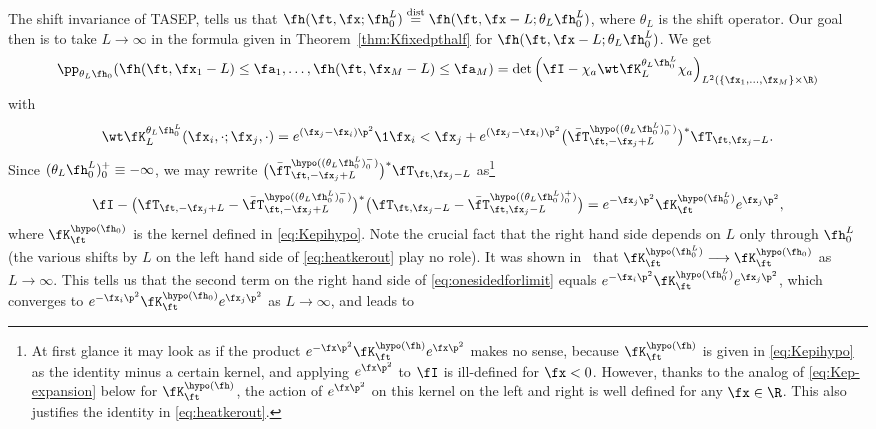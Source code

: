 \documentclass[]{pcmi}
\theoremstyle{plain}
\theoremstyle{definition}
\begin{document}
The shift invariance of TASEP, tells us that $\fh(\ft, \fx; \fh_0^L)\stackrel{\text{dist}}{=} \fh(\ft,\fx-L;\theta_L\fh_0^L)$, where $\theta_L$ is the shift operator.
Our goal then is to take $L\to\infty$ in the formula given in Theorem~\ref{thm:Kfixedpthalf} for $\fh(\ft,\fx-L;\theta_L\fh_0^L)$.
We get
\[\pp_{\theta_L\fh_0}\!\left(\fh(\ft,\fx_1-L)\leq \fa_1,\ldots,\fh(\ft,\fx_M-L)\leq \fa_M\right)
=\det\left(\fI-\chi_{a}\wt\fK^{\theta_L\fh_0^L}_L\chi_{a}\right)_{L^2(\{\fx_1,\ldots,\fx_M\}\times\R)}\]
with
\begin{equation}\label{eq:onesidedforlimit}
\wt\fK^{\theta_L\fh_0^L}_L(\fx_i,\cdot ;\fx_j,\cdot)=e^{(\fx_j-\fx_i)\p^2}\1{\fx_i<\fx_j}+e^{(\fx_j-\fx_i)\p^2}\bigl(\bar{\fT}^{\hypo((\theta_L\fh_0^L)^-_0)}_{\ft,-\fx_j+L}\bigr)^*\fT_{\ft,\fx_j-L}.
\end{equation}
Since $(\theta_{L}\fh_0^L)_0^+\equiv-\infty$, we may rewrite $\bigl(\bar{\fT}^{\hypo((\theta_L\fh_0^L)^-_0)}_{\ft,-\fx_j+L}\bigr)^*\fT_{\ft,\fx_j-L}$ as\footnote{At first glance it may look as if the product $e^{-\fx\p^2}\fK^{\hypo(\fh)}_\ft e^{\fx\p^2}$ makes no sense, because $\fK^{\hypo(\fh)}_{\ft}$ is given in \eqref{eq:Kepihypo} as the identity minus a certain kernel, and applying $e^{\fx\p^2}$ to $\fI$ is ill-defined for $\fx<0$.
However, thanks to the analog of \eqref{eq:Kep-expansion} below for $\fK^{\hypo(\fh)}_\ft$, the action of $e^{\fx\p^2}$ on this kernel on the left and right is well defined for any $\fx\in\R$.
This also justifies the identity in \eqref{eq:heatkerout}.}
\[
\fI- \bigl(\fT_{\ft,-\fx_j+L}-\bar{\fT}^{\hypo((\theta_L\fh_0^L)^-_0)}_{\ft,-\fx_j+L}\bigr)^*\bigl(\fT_{\ft,\fx_j-L}-\bar{\fT}^{\hypo((\theta_L\fh_0^L)^+_0)}_{\ft,\fx_j-L}\bigr)
=e^{-\fx_j\p^2}\fK^{\hypo(\fh_0^L)}_\ft e^{\fx_j\p^2},\label{eq:heatkerout}
\]
where $\fK^{\hypo(\fh_0)}_\ft$ is the kernel defined in \eqref{eq:Kepihypo}.
Note the crucial fact that the right hand side depends on $L$ only through $\fh_0^L$ (the various shifts by $L$ on the left hand side of \eqref{eq:heatkerout} play no role).
It was shown in~\cite{flat} that $\fK^{\hypo(\fh_0^L)}_\ft\longrightarrow\fK^{\hypo(\fh_0)}_\ft$ as $L\to\infty$.
This tells us that the second term on the right hand side of \eqref{eq:onesidedforlimit} equals $e^{-\fx_i\p^2}\fK^{\hypo(\fh_0^L)}_\ft e^{\fx_j\p^2}$, which converges to $e^{-\fx_i\p^2}\fK^{\hypo(\fh_0)}_\ft e^{\fx_j\p^2}$ as $L\to\infty$, and leads to
\end{document}
